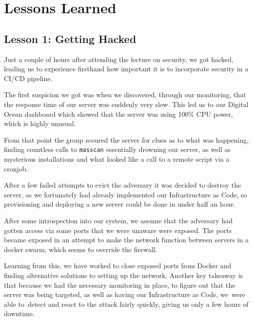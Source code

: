 \section{Lessons Learned}

\subsection{Lesson 1: Getting Hacked}
Just a couple of hours after attending the lecture on security, we got hacked, leading us to experience firsthand how important it is to incorporate security in a CI/CD pipeline.

The first suspicion we got was when we discovered, through our monitoring, that the response time of our server was suddenly very slow. This led us to our Digital Ocean dashboard which showed that the server was using 100\% CPU power, which is highly unusual.

From that point the group scoured the server for clues as to what was happening, finding countless calls to \texttt{masscan} essentially drowning our server, as well as mysterious installations and what looked like a call to a remote script via a cronjob.

After a few failed attempts to evict the adversary it was decided to destroy the server, as we fortunately had already implemented our Infrastructure as Code, so provisioning and deploying a new server could be done in under half an hour.

After some introspection into our system, we assume that the adversary had gotten access via some ports that we were unaware were exposed. The ports became exposed in an attempt to make the network function between servers in a docker swarm, which seems to override the firewall.

Learning from this, we have worked to close exposed ports from Docker and finding alternative solutions to setting up the network. Another key takeaway is that because we had the necessary monitoring in place, to figure out that the server was being targeted, as well as having our Infrastructure as Code, we were able to detect and react to the attack fairly quickly, giving us only a few hours of downtime.


